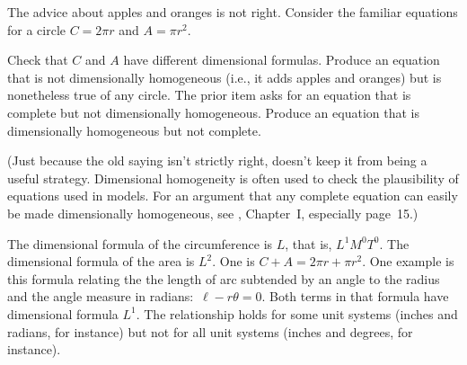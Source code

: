 \begin{exercises}
    The advice about apples and oranges is not right.
    Consider the familiar equations for a circle $C=2\pi r$ and $A=\pi r^2$.
    \begin{exparts}
      \partsitem Check that $C$ and $A$ have different dimensional formulas.
      \partsitem Produce an equation that is not
        dimensionally homogeneous (i.e., 
        it adds apples and oranges) but is nonetheless true of any circle.
      \partsitem The prior item asks for an equation that is complete but
        not dimensionally homogeneous.
        Produce an equation that is dimensionally homogeneous but not complete.
    \end{exparts}
    (Just because the old saying isn't strictly right, doesn't 
    keep it from being a useful strategy.
    Dimensional homogeneity is often used to check the plausibility of 
    equations used in models.
    For an argument that any complete equation can easily be made 
     dimensionally homogeneous, see \cite{Bridgman}, Chapter~I, 
     especially page~15.)
    \begin{answer}
      \begin{exparts}
        \partsitem The dimensional formula of the circumference is $L$,
          that is, $L^1M^0T^0$.
          The dimensional formula of the area is $L^2$.
        \partsitem One is $C+A=2\pi r + \pi r^2$.
        \partsitem One example is this formula relating the  
           the length of arc subtended by an angle to the radius and the
           angle measure in radians:~$\ell-r\theta=0$.
           Both terms in that formula have dimensional
           formula $L^1$.
           The relationship holds for some
           unit systems (inches and radians, for instance) but not for all
           unit systems (inches and degrees, for instance).  
      \end{exparts}
    \end{answer}
\end{exercises}
\endinput
